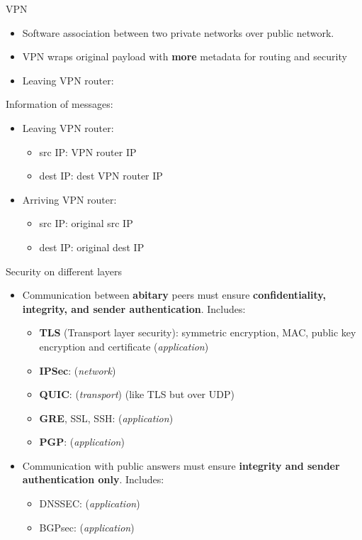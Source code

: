 \begin{definition}
    {VPN}
    \begin{itemize}
        \item Software association between two private networks over public network.
        \item VPN wraps original payload with \textbf{more} metadata for routing and security
        \item Leaving VPN router:
    \end{itemize}

    Information of messages:
    \begin{itemize}
        \item Leaving VPN router:
              \begin{itemize}
                  \item src IP: VPN router IP
                  \item dest IP: dest VPN router IP
              \end{itemize}
        \item Arriving VPN router:
              \begin{itemize}
                  \item src IP: original src IP
                  \item dest IP: original dest IP
              \end{itemize}
    \end{itemize}
\end{definition}

\begin{definition}
    {Security on different layers}
    \begin{itemize}
        \item Communication between \textbf{abitary} peers must ensure \textbf{confidentiality, integrity, and sender authentication}. Includes:
              \begin{itemize}
                  \item \textbf{TLS} (Transport layer security):  symmetric encryption, MAC, public key encryption and certificate (\textit{application})
                  \item \textbf{IPSec}: (\textit{network})
                  \item \textbf{QUIC}: (\textit{transport}) (like TLS but over UDP)
                  \item \textbf{GRE}, SSL, SSH: (\textit{application})
                  \item \textbf{PGP}: (\textit{application})
              \end{itemize}
        \item Communication with public answers must ensure \textbf{integrity and sender authentication only}. Includes:
              \begin{itemize}
                  \item DNSSEC: (\textit{application})
                  \item BGPsec: (\textit{application})
              \end{itemize}
    \end{itemize}
\end{definition}

